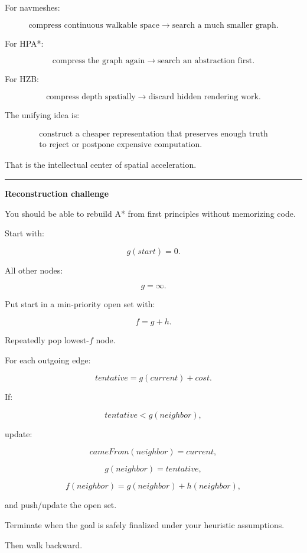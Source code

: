 For navmeshes:

\[
\text{compress continuous walkable space}
\rightarrow
\text{search a much smaller graph}.
\]

For HPA*:

\[
\text{compress the graph again}
\rightarrow
\text{search an abstraction first}.
\]

For HZB:

\[
\text{compress depth spatially}
\rightarrow
\text{discard hidden rendering work}.
\]

The unifying idea is:

\[\boxed{\begin{gathered}\text{construct a cheaper representation that preserves enough truth}\\\text{to reject or postpone expensive computation.}\end{gathered}}\]

That is the intellectual center of spatial acceleration.

\begin{center}\rule{0.5\linewidth}{0.5pt}\end{center}

\textbf{Reconstruction challenge}

You should be able to rebuild A* from first principles without memorizing code.

Start with:

\[
g(start)=0.
\]

All other nodes:

\[
g=\infty.
\]

Put start in a min-priority open set with:

\[
f=g+h.
\]

Repeatedly pop lowest-\(f\) node.

For each outgoing edge:

\[
tentative=
g(current)+cost.
\]

If:

\[
tentative<g(neighbor),
\]

update:

\[
cameFrom(neighbor)=current,
\]

\[
g(neighbor)=tentative,
\]

\[
f(neighbor)=g(neighbor)+h(neighbor),
\]

and push/update the open set.

Terminate when the goal is safely finalized under your heuristic assumptions.

Then walk  backward.


